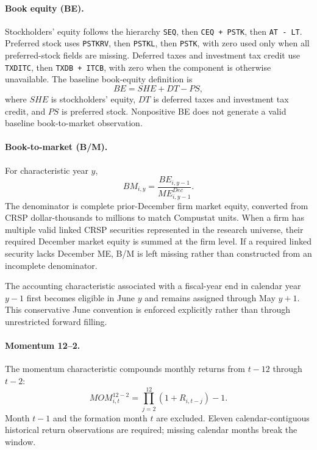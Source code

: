 \paragraph{Book equity (BE).}
Stockholders' equity follows the hierarchy \texttt{SEQ}, then \texttt{CEQ + PSTK}, then \texttt{AT - LT}. Preferred stock uses \texttt{PSTKRV}, then \texttt{PSTKL}, then \texttt{PSTK}, with zero used only when all preferred-stock fields are missing. Deferred taxes and investment tax credit use \texttt{TXDITC}, then \texttt{TXDB + ITCB}, with zero when the component is otherwise unavailable. The baseline book-equity definition is
\begin{equation}
BE = SHE + DT - PS,
\end{equation}
where $SHE$ is stockholders' equity, $DT$ is deferred taxes and investment tax credit, and $PS$ is preferred stock. Nonpositive BE does not generate a valid baseline book-to-market observation.

\paragraph{Book-to-market (B/M).}
For characteristic year $y$,
\begin{equation}
BM_{i,y}=\frac{BE_{i,y-1}}{ME^{Dec}_{i,y-1}}.
\end{equation}
The denominator is complete prior-December firm market equity, converted from CRSP dollar-thousands to millions to match Compustat units. When a firm has multiple valid linked CRSP securities represented in the research universe, their required December market equity is summed at the firm level. If a required linked security lacks December ME, B/M is left missing rather than constructed from an incomplete denominator.

The accounting characteristic associated with a fiscal-year end in calendar year $y-1$ first becomes eligible in June $y$ and remains assigned through May $y+1$. This conservative June convention is enforced explicitly rather than through unrestricted forward filling.

\paragraph{Momentum 12--2.}
The momentum characteristic compounds monthly returns from $t-12$ through $t-2$:
\begin{equation}
MOM_{i,t}^{12-2}=\prod_{j=2}^{12}(1+R_{i,t-j})-1.
\end{equation}
Month $t-1$ and the formation month $t$ are excluded. Eleven calendar-contiguous historical return observations are required; missing calendar months break the window.

